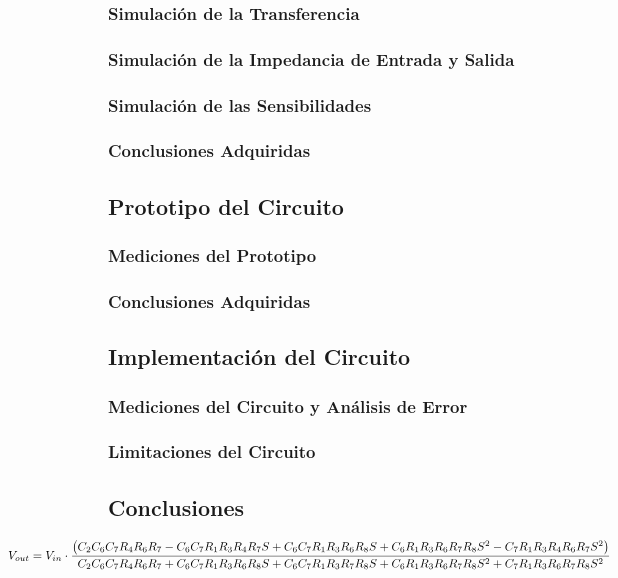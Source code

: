 \documentclass[a4paper]{article}
\begin{document}
\subsubsection{Simulación de la Transferencia}
\subsubsection{Simulación de la Impedancia de Entrada y Salida}
\subsubsection{Simulación de las Sensibilidades}
\subsubsection{Conclusiones Adquiridas}

\subsection{Prototipo del Circuito}
\subsubsection{Mediciones del Prototipo}
\subsubsection{Conclusiones Adquiridas}

\subsection{Implementación del Circuito}
\subsubsection{Mediciones del Circuito y Análisis de Error}
\subsubsection{Limitaciones del Circuito}

\subsection{Conclusiones}

\begin{equation}
\hspace{-3cm}
V_{out} = V_{in} \cdot \frac{\left(C_{2} C_{6} C_{7} R_{4} R_{6} R_{7} - C_{6} C_{7} R_{1} R_{3} R_{4} R_{7} S + C_{6} C_{7} R_{1} R_{3} R_{6} R_{8} S + C_{6} R_{1} R_{3} R_{6} R_{7} R_{8} S^{2} - C_{7} R_{1} R_{3} R_{4} R_{6} R_{7} S^{2}\right)}{C_{2} C_{6} C_{7} R_{4} R_{6} R_{7} + C_{6} C_{7} R_{1} R_{3} R_{6} R_{8} S + C_{6} C_{7} R_{1} R_{3} R_{7} R_{8} S + C_{6} R_{1} R_{3} R_{6} R_{7} R_{8} S^{2} + C_{7} R_{1} R_{3} R_{6} R_{7} R_{8} S^{2}}
\end{equation}
\end{document}
